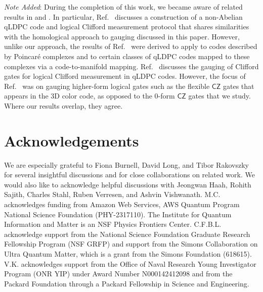 \documentclass[aps,prx,reprint,superscriptaddress,nofootinbib]{revtex4-2}
\theoremstyle{definition}
\newcommand{\<}{\langle}
\renewcommand{\>}{\rangle}
\begin{document}
\textit{Note Added}: During the completion of this work, we became aware of related results in \cite{zhu_non-abelian_2026} and \cite{williamson_fast_2026}.
%
In particular, Ref.~\cite{zhu_non-abelian_2026} discusses a construction of a non-Abelian qLDPC code and logical Clifford measurement protocol  that shares similarities with the homological approach to gauging discussed in this paper.
%
However, unlike our approach, the results of Ref.~\cite{zhu_non-abelian_2026} were derived to apply to codes described by Poincar\'e complexes and to certain classes of qLDPC codes mapped to these complexes via a code-to-manifold mapping.
%
Ref.~\cite{williamson_fast_2026} discusses the gauging of Clifford gates for logical Clifford measurement in qLDPC codes.
%
However, the focus of Ref.~\cite{williamson_fast_2026} was on gauging higher-form logical gates such as the flexible $\mathsf{CZ}$ gates that appears in the 3D color code, as opposed to the $0$-form $\mathsf{CZ}$ gates that we study.
%
Where our results overlap, they agree.




\section{Acknowledgements}

We are especially grateful to Fiona Burnell, David Long, and Tibor Rakovszky for several insightful discussions and for close collaborations on related work.
%
We would also like to acknowledge helpful discussions with Jeongwan Haah, Rohith Sajith, Charles Stahl, Ruben Verresen, and Ashvin Vishwanath.
%
M.C. acknowledges funding from Amazon Web Services, AWS Quantum Program National Science Foundation (PHY-2317110). 
%
The Institute for Quantum Information and Matter is an NSF Physics Frontiers Center. C.F.B.L. acknowledge support from the National Science Foundation Graduate Research Fellowship Program (NSF GRFP) and support from the Simons Collaboration on Ultra Quantum Matter, which is a grant from the Simons Foundation (618615).
%
V.K. acknowledges support from the Office of Naval Research Young Investigator Program (ONR YIP) under Award Number N000142412098 and from the Packard Foundation through a Packard Fellowship in Science and Engineering.

\end{document}
